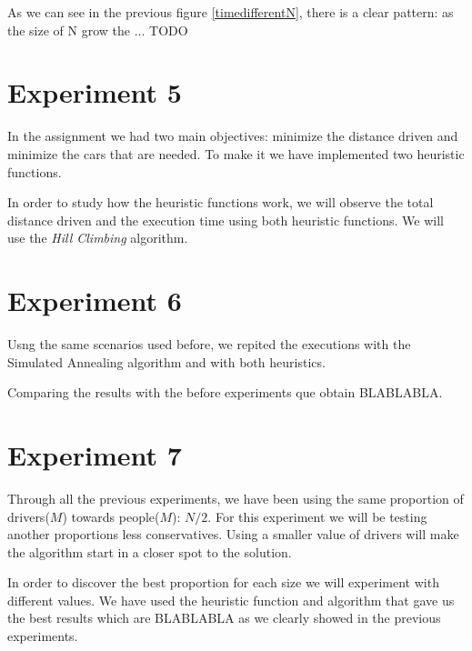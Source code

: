 \documentclass[12]{article}
\begin{document}
\vspace{1cm}

As we can see in the previous figure \ref{timedifferentN}, there is a clear pattern: as the size of N grow the ... TODO 


\section{Experiment 5}
In the assignment we had two main objectives: minimize the distance driven and minimize the cars that are needed. To make it we have implemented two heuristic functions. 

In order to study how the heuristic functions work, we will observe the total distance driven and the execution time using both heuristic functions. We will use the \textit{Hill Climbing} algorithm.


\section{Experiment 6}
Usng the same scenarios used before, we repited the executions with the Simulated Annealing algorithm and with both heuristics.

Comparing the results with the before experiments que obtain BLABLABLA.


\section{Experiment 7}
Through all the previous experiments, we have been using the same proportion of drivers($M$) towards people($M$): $N/2$. For this experiment we will be testing another proportions less conservatives. Using a smaller value of drivers will make the algorithm start in a closer spot to the solution.

In order to discover the best proportion for each size we will experiment with different values. We have used the heuristic function and algorithm that gave us the best results which are BLABLABLA as we clearly showed in the previous experiments. 
\end{document}
